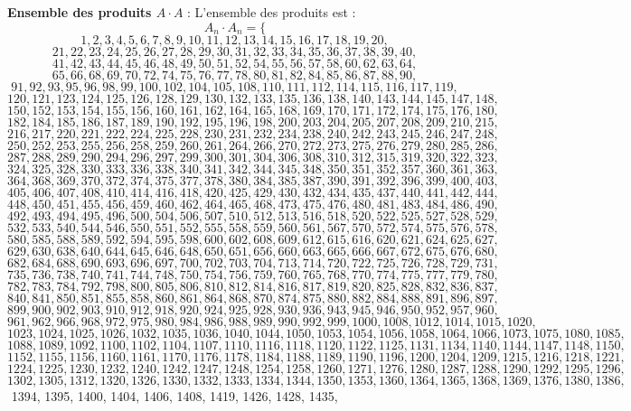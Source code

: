 \documentclass[11pt,a4paper]{article}
\begin{document}
\textbf{Ensemble des produits $A \cdot A$} :
L'ensemble des produits est :
$$ A_{{{n}}} \cdot A_{{{n}}} = \{ $$$$ 1, 2, 3, 4, 5, 6, 7, 8, 9, 10, 11, 12, 13, 14, 15, 16, 17, 18, 19, 20, $$$$ 21, 22, 23, 24, 25, 26, 27, 28, 29, 30, 31, 32, 33, 34, 35, 36, 37, 38, 39, 40, $$$$ 41, 42, 43, 44, 45, 46, 48, 49, 50, 51, 52, 54, 55, 56, 57, 58, 60, 62, 63, 64, $$$$ 65, 66, 68, 69, 70, 72, 74, 75, 76, 77, 78, 80, 81, 82, 84, 85, 86, 87, 88, 90, $$$$ 91, 92, 93, 95, 96, 98, 99, 100, 102, 104, 105, 108, 110, 111, 112, 114, 115, 116, 117, 119, $$$$ 120, 121, 123, 124, 125, 126, 128, 129, 130, 132, 133, 135, 136, 138, 140, 143, 144, 145, 147, 148, $$$$ 150, 152, 153, 154, 155, 156, 160, 161, 162, 164, 165, 168, 169, 170, 171, 172, 174, 175, 176, 180, $$$$ 182, 184, 185, 186, 187, 189, 190, 192, 195, 196, 198, 200, 203, 204, 205, 207, 208, 209, 210, 215, $$$$ 216, 217, 220, 221, 222, 224, 225, 228, 230, 231, 232, 234, 238, 240, 242, 243, 245, 246, 247, 248, $$$$ 250, 252, 253, 255, 256, 258, 259, 260, 261, 264, 266, 270, 272, 273, 275, 276, 279, 280, 285, 286, $$$$ 287, 288, 289, 290, 294, 296, 297, 299, 300, 301, 304, 306, 308, 310, 312, 315, 319, 320, 322, 323, $$$$ 324, 325, 328, 330, 333, 336, 338, 340, 341, 342, 344, 345, 348, 350, 351, 352, 357, 360, 361, 363, $$$$ 364, 368, 369, 370, 372, 374, 375, 377, 378, 380, 384, 385, 387, 390, 391, 392, 396, 399, 400, 403, $$$$ 405, 406, 407, 408, 410, 414, 416, 418, 420, 425, 429, 430, 432, 434, 435, 437, 440, 441, 442, 444, $$$$ 448, 450, 451, 455, 456, 459, 460, 462, 464, 465, 468, 473, 475, 476, 480, 481, 483, 484, 486, 490, $$$$ 492, 493, 494, 495, 496, 500, 504, 506, 507, 510, 512, 513, 516, 518, 520, 522, 525, 527, 528, 529, $$$$ 532, 533, 540, 544, 546, 550, 551, 552, 555, 558, 559, 560, 561, 567, 570, 572, 574, 575, 576, 578, $$$$ 580, 585, 588, 589, 592, 594, 595, 598, 600, 602, 608, 609, 612, 615, 616, 620, 621, 624, 625, 627, $$$$ 629, 630, 638, 640, 644, 645, 646, 648, 650, 651, 656, 660, 663, 665, 666, 667, 672, 675, 676, 680, $$$$ 682, 684, 688, 690, 693, 696, 697, 700, 702, 703, 704, 713, 714, 720, 722, 725, 726, 728, 729, 731, $$$$ 735, 736, 738, 740, 741, 744, 748, 750, 754, 756, 759, 760, 765, 768, 770, 774, 775, 777, 779, 780, $$$$ 782, 783, 784, 792, 798, 800, 805, 806, 810, 812, 814, 816, 817, 819, 820, 825, 828, 832, 836, 837, $$$$ 840, 841, 850, 851, 855, 858, 860, 861, 864, 868, 870, 874, 875, 880, 882, 884, 888, 891, 896, 897, $$$$ 899, 900, 902, 903, 910, 912, 918, 920, 924, 925, 928, 930, 936, 943, 945, 946, 950, 952, 957, 960, $$$$ 961, 962, 966, 968, 972, 975, 980, 984, 986, 988, 989, 990, 992, 999, 1000, 1008, 1012, 1014, 1015, 1020, $$$$ 1023, 1024, 1025, 1026, 1032, 1035, 1036, 1040, 1044, 1050, 1053, 1054, 1056, 1058, 1064, 1066, 1073, 1075, 1080, 1085, $$$$ 1088, 1089, 1092, 1100, 1102, 1104, 1107, 1110, 1116, 1118, 1120, 1122, 1125, 1131, 1134, 1140, 1144, 1147, 1148, 1150, $$$$ 1152, 1155, 1156, 1160, 1161, 1170, 1176, 1178, 1184, 1188, 1189, 1190, 1196, 1200, 1204, 1209, 1215, 1216, 1218, 1221, $$$$ 1224, 1225, 1230, 1232, 1240, 1242, 1247, 1248, 1254, 1258, 1260, 1271, 1276, 1280, 1287, 1288, 1290, 1292, 1295, 1296, $$$$ 1302, 1305, 1312, 1320, 1326, 1330, 1332, 1333, 1334, 1344, 1350, 1353, 1360, 1364, 1365, 1368, 1369, 1376, 1380, 1386, $$$$ 1394, 1395, 1400, 1404, 1406, 1408, 1419, 1426, 1428, 1435, 
\end{document}
